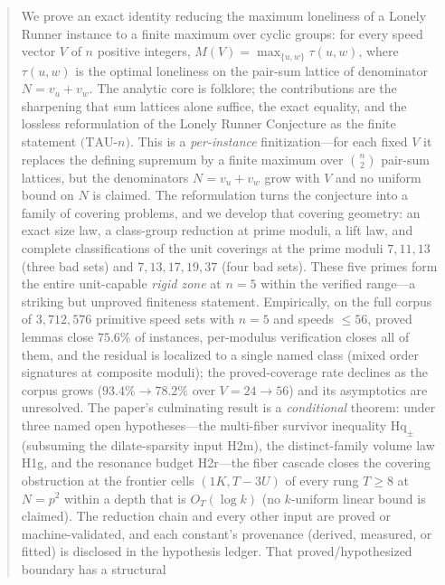 
\begin{abstract}
\noindent
We prove an exact identity reducing the maximum loneliness of a Lonely
Runner instance to a finite maximum over cyclic groups: for every speed
vector $V$ of $n$ positive integers, $M(V)=\max_{\{u,w\}}\tau(u,w)$,
where $\tau(u,w)$ is the optimal loneliness on the pair-sum lattice of
denominator $N=v_u+v_w$. The analytic core is folklore; the contributions
are the sharpening that sum lattices alone suffice, the exact equality,
and the lossless reformulation of the Lonely Runner Conjecture as the
finite statement $(\mathrm{TAU}$-$n)$. This is a \emph{per-instance}
finitization---for each fixed $V$ it replaces the defining supremum by a
finite maximum over $\binom{n}{2}$ pair-sum lattices, but the denominators
$N=v_u+v_w$ grow with $V$ and no uniform bound on $N$ is claimed. The
reformulation turns the conjecture into a family of covering problems,
and we develop that covering geometry: an exact size law, a class-group
reduction at prime moduli, a lift law, and complete classifications of
the unit coverings at the prime moduli $7,11,13$ (three bad sets) and
$7,13,17,19,37$ (four bad sets). These five primes form the entire
unit-capable \emph{rigid zone} at $n=5$ within the verified range---a
striking but unproved finiteness statement. Empirically, on the full
corpus of $3{,}712{,}576$ primitive speed sets with $n=5$ and speeds
$\le 56$, proved lemmas close $75.6\%$ of instances, per-modulus
verification closes all of them, and the residual is localized to a
single named class (mixed order signatures at composite moduli); the
proved-coverage rate declines as the corpus grows
($93.4\%\to78.2\%$ over $V=24\to56$) and its asymptotics are unresolved.
The paper's culminating result is a \emph{conditional} theorem: under
three named open hypotheses---the multi-fiber survivor inequality
$\mathrm{Hq}_\pm$ (subsuming the dilate-sparsity input H2m), the
distinct-family volume law H1g, and the resonance budget H2r---the fiber
cascade closes the covering obstruction at the frontier cells
$(1K,T{-}3U)$ of every rung $T\ge 8$ at $N=p^2$ within a depth that is
$O_T(\log k)$ (no $k$-uniform linear bound is claimed). The reduction
chain and every other input are proved or machine-validated, and each
constant's provenance (derived, measured, or fitted) is disclosed in the
hypothesis ledger. That proved/hypothesized boundary has a structural

\end{abstract}
